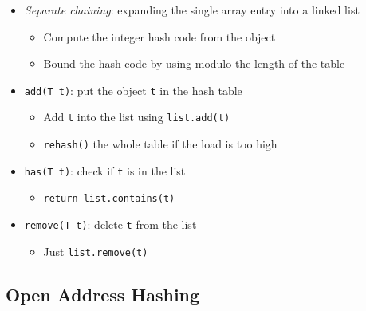 \documentclass[
  10pt,
  english,
  letterpaper,
,tablecaptionabove
]{scrartcl}
\newcommand{\passthrough}[1]{#1}
\providecommand{\tightlist}{%
  \setlength{\itemsep}{0pt}\setlength{\parskip}{0pt}}
\begin{document}
\begin{itemize}
\tightlist
\item
  \emph{Separate chaining}: expanding the single array entry into a
  linked list

  \begin{itemize}
  \tightlist
  \item
    Compute the integer hash code from the object
  \item
    Bound the hash code by using modulo the length of the table
  \end{itemize}
\item
  \passthrough{\lstinline!add(T t)!}: put the object
  \passthrough{\lstinline!t!} in the hash table

  \begin{itemize}
  \tightlist
  \item
    Add \passthrough{\lstinline!t!} into the list using
    \passthrough{\lstinline!list.add(t)!}
  \item
    \passthrough{\lstinline!rehash()!} the whole table if the load is
    too high
  \end{itemize}
\item
  \passthrough{\lstinline!has(T t)!}: check if
  \passthrough{\lstinline!t!} is in the list

  \begin{itemize}
  \tightlist
  \item
    \passthrough{\lstinline!return list.contains(t)!}
  \end{itemize}
\item
  \passthrough{\lstinline!remove(T t)!}: delete
  \passthrough{\lstinline!t!} from the list

  \begin{itemize}
  \tightlist
  \item
    Just \passthrough{\lstinline!list.remove(t)!}
  \end{itemize}
\end{itemize}

\hypertarget{open-address-hashing}{%
\subsection{Open Address Hashing}\label{open-address-hashing}}
\end{document}
